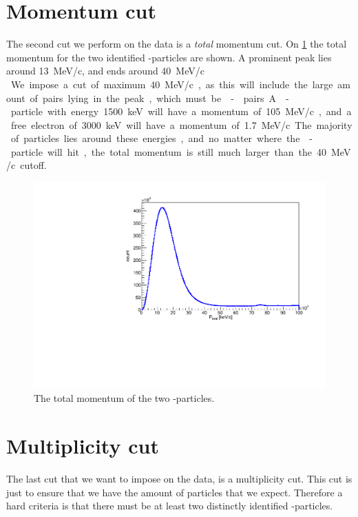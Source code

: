 \section{Momentum cut}
The second cut we perform on the data is a \textit{total} momentum cut. On \cref{fig:totalMomentum} the total momentum for the two identified \al-particles are shown. 
A prominent peak lies around \SI{13}{MeV/c}, and ends around \SI{40}{MeV/c }. 
We impose a cut of maximum \SI{40}{MeV/c}, as this will include the large amount of pairs lying in the peak, which must be \al-\al pairs. A \al-particle with energy \SI{1500}{keV} will have a momentum of \SI{105}{MeV/c}, and a free electron of \SI{3000}{keV} will have a momentum of \SI{1.7}{MeV/c}. 
The majority of particles lies around these energies, and no matter where the \be-particle will hit, the total momentum is still much larger than the \SI{40}{MeV/c} cutoff. 
\begin{figure}[h]
	\centering
	\includegraphics[width=\linewidth]{../figures/ptotNoCut.pdf}
	\caption{The total momentum of the two \al-particles.}
	\label{fig:totalMomentum}
\end{figure}

\section{Multiplicity cut}
The last cut that we want to impose on the data, is a multiplicity cut. This cut is just to ensure that we have the amount of particles that we expect. 
Therefore a hard criteria is that there must be at least two distinctly identified \al-particles. \\


